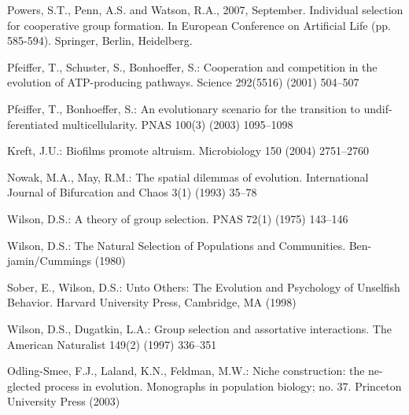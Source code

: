 \documentclass[runningheads]{llncs}
\begin{document}
%
%
%
% 
% 
%
\begin{thebibliography}{8}

Powers, S.T., Penn, A.S. and Watson, R.A., 2007, September. Individual
selection for cooperative group formation. In European Conference on
Artificial Life (pp. 585-594). Springer, Berlin, Heidelberg.

  
Pfeiffer, T., Schuster, S., Bonhoeffer, S.: Cooperation and competition in the evolution of ATP-producing pathways. Science 292(5516) (2001) 504–507 

Pfeiffer, T., Bonhoeffer, S.: An evolutionary scenario for the
transition to undif-ferentiated multicellularity. PNAS 100(3) (2003)
1095–1098

Kreft, J.U.: Biofilms promote altruism. Microbiology 150 (2004)
2751–2760


Nowak, M.A., May, R.M.: The spatial dilemmas of
evolution. International Journal of Bifurcation and Chaos 3(1) (1993)
35–78

Wilson, D.S.: A theory of group selection. PNAS 72(1) (1975) 143–146 

Wilson, D.S.: The Natural Selection of Populations and Communities. Ben-jamin/Cummings (1980) 

Sober, E., Wilson, D.S.: Unto Others: The Evolution and Psychology of Unselfish Behavior. Harvard University Press, Cambridge, MA (1998) 

Wilson, D.S., Dugatkin, L.A.: Group selection and assortative
interactions. The American Naturalist 149(2) (1997) 336–351

Odling-Smee, F.J., Laland, K.N., Feldman, M.W.: Niche construction:
the ne-glected process in evolution. Monographs in population biology;
no. 37. Princeton University Press (2003)


\end{thebibliography}
\end{document}
